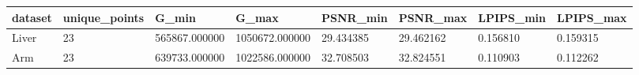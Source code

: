 \begin{tabular}{llllllll}
dataset & unique\_points & G\_min & G\_max & PSNR\_min & PSNR\_max & LPIPS\_min & LPIPS\_max \\
\hline
Liver & 23 & 565867.000000 & 1050672.000000 & 29.434385 & 29.462162 & 0.156810 & 0.159315 \\
Arm & 23 & 639733.000000 & 1022586.000000 & 32.708503 & 32.824551 & 0.110903 & 0.112262 \\
\end{tabular}
